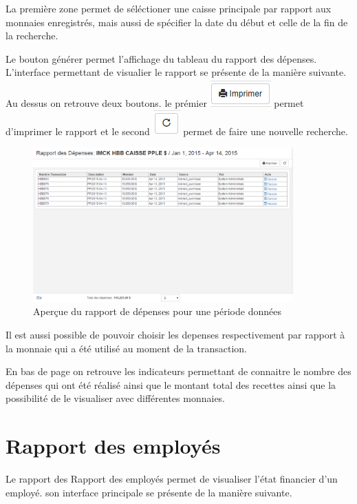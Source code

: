 \documentclass[12pt,a4paper]{report}
\begin{document}
La première zone permet de séléctioner une caisse principale par rapport aux monnaies enregistrés, mais aussi de spécifier la date du début et celle de la fin de la recherche. 

Le bouton générer permet l'affichage du tableau du rapport des dépenses. L'interface permettant de visualier le rapport se présente de la manière suivante. Au dessus on retrouve deux boutons. le prémier 
\includegraphics[scale=0.7]{pic/Print.png} permet d'imprimer le rapport et le second \includegraphics[scale=0.7]{pic/refresh.png} permet de faire une nouvelle recherche.

\begin{figure}[h]
\begin{center}
\includegraphics[width=10cm]{pic/RapDepensesApercue.png}
\end{center}
\caption{Aperçue du rapport de dépenses pour une période données}
\label{Aperçue du rapport de dépenses pour une période données}
\end{figure}

Il est aussi possible de pouvoir choisir les depenses respectivement par rapport à la monnaie qui a été utilisé au moment de la transaction.

En bas de page on retrouve les indicateurs permettant de connaitre le nombre des dépenses qui ont été réalisé ainsi que le montant total des recettes ainsi que la possibilité de le visualiser avec différentes monnaies. 

\newpage
\section{Rapport des employés}
Le rapport des Rapport des employés permet de visualiser l'état financier d'un employé. son interface principale se présente de la manière suivante. 
\end{document}
